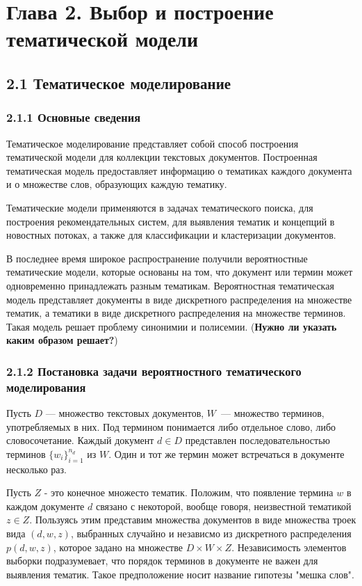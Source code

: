 \documentclass[a4paper]{report}
\begin{document}
	
	
	\newpage
	\section{Глава 2. Выбор и построение тематической модели}
	\subsection{2.1 Тематическое моделирование}
	\subsubsection{2.1.1 Основные сведения}
	Тематическое моделирование представляет собой  способ построения тематической модели для коллекции текстовых документов. Построенная тематическая модель предоставляет информацию о тематиках каждого документа и о множестве слов, образующих каждую тематику. 
	
	Тематические модели применяются в задачах тематического поиска, для построения рекомендательных систем, для выявления тематик и концепций в новостных потоках, а также для классификации и кластеризации документов. 
	
	В последнее время широкое распространение получили вероятностные тематические модели, которые основаны на том, что документ или термин может одновременно принадлежать разным тематикам. Вероятностная тематическая модель представляет документы в виде дискретного распределения на множестве тематик, а тематики в виде дискретного распределения на множестве терминов. Такая модель решает проблему синонимии и полисемии. (\textbf{Нужно ли указать каким образом решает?})
	
	\subsubsection{2.1.2 Постановка задачи вероятностного тематического моделирования}
	
	Пусть $D$ --- множество текстовых документов, $W$~--- множество терминов, употребляемых в них. Под термином понимается либо отдельное слово, либо словосочетание. Каждый документ $d \in D$ представлен последовательностью терминов 
	$ \{w_i\}_{i=1}^{n_d}$ из $W$.
	Один и тот же термин может встречаться в документе несколько раз.
	
	Пусть $Z$ - это конечное множесто тематик. Положим, что появление термина $w$ в каждом документе $d$ связано с некоторой, вообще говоря, неизвестной тематикой $z \in Z$. Пользуясь этим представим множества документов в виде множества троек вида $(d,w,z)$, выбранных случайно и независмо из дискретного распределения $p(d,w,z)$, которое задано на множестве $D \times W \times Z$. Независимость элементов выборки подразумевает, что порядок терминов в документе не важен для выявления тематик. Такое предположение носит название гипотезы "мешка слов".
	
\end{document}
